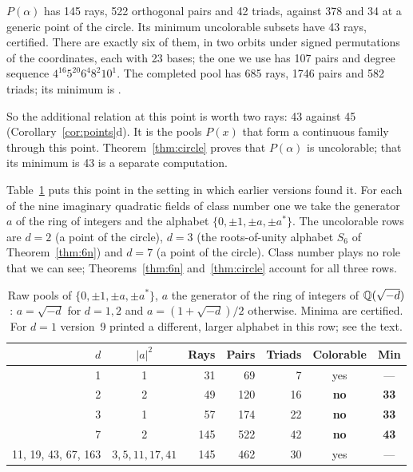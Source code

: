 \begin{fact}\label{fact:heegner}
$P(\alpha)$ has 145 rays, 522 orthogonal pairs and 42 triads, against 378 and 34 at a generic
point of the circle.  Its minimum uncolorable subsets have 43 rays, certified.  There are exactly
six of them, in two orbits under signed permutations of the coordinates, each with 23 bases; the
one we use has 107 pairs and degree sequence $4^{16}5^{20}6^{4}8^{2}10^{1}$.  The completed pool
has 685 rays, 1746 pairs and 582 triads; its minimum is \heegnercompletedmin.
\end{fact}

So the additional relation at this point is worth two rays: 43 against 45
(Corollary~\ref{cor:points}d).  It is the pools $P(x)$ that form a continuous family through
this point.  Theorem~\ref{thm:circle} proves that $P(\alpha)$ is uncolorable; that its minimum is
43 is a separate computation.

Table~\ref{tab:heegner} puts this point in the setting in which earlier versions found it.  For
each of the nine imaginary quadratic fields of class number one we take the generator $a$ of the
ring of integers and the alphabet $\{0,\pm1,\pm a,\pm a^{*}\}$.  The uncolorable rows are
$d=2$ (a point of the circle), $d=3$ (the roots-of-unity alphabet $S_6$ of
Theorem~\ref{thm:6n}) and $d=7$ (a point of the circle).  Class number plays no role that we can
see; Theorems~\ref{thm:6n} and~\ref{thm:circle} account for all three rows.

\begin{table}[t]
\centering
\caption{Raw pools of $\{0,\pm1,\pm a,\pm a^{*}\}$, $a$ the generator of the ring of integers of
$\mathbb{Q}(\sqrt{-d})$: $a=\sqrt{-d}$ for $d=1,2$ and $a=(1+\sqrt{-d})/2$ otherwise.  Minima are
certified.  For $d=1$ version~9 printed a different, larger alphabet in this row; see the text.}
\label{tab:heegner}
\begin{tabular}{rcrrrcc}
\toprule
$d$ & $|a|^2$ & Rays & Pairs & Triads & Colorable & Min \\
\midrule
1 & 1 & 31 & 69 & 7 & yes & --- \\
2 & 2 & 49 & 120 & 16 & \textbf{no} & \textbf{33} \\
3 & 1 & 57 & 174 & 22 & \textbf{no} & \textbf{33} \\
7 & 2 & 145 & 522 & 42 & \textbf{no} & \textbf{43} \\
11, 19, 43, 67, 163 & $3,5,11,17,41$ & 145 & 462 & 30 & yes & --- \\
\bottomrule
\end{tabular}
\end{table}

